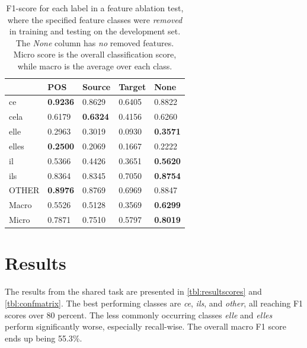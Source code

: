 \documentclass[11pt]{article}
\begin{document}
\begin{table}[t]
\centering
    \begin{tabular}{lllll}
         & POS & Source & Target & None \\ \midrule
   ce    & \textbf{0.9236}   & 0.8629         & 0.6405         &  0.8822 \\
   cela  & 0.6179   & \textbf{0.6324}         & 0.4156         &  0.6260 \\
   elle  & 0.2963   & 0.3019         & 0.0930          &  \textbf{0.3571} \\
   elles & \textbf{0.2500}   & 0.2069         & 0.1667         &  0.2222 \\
   il    & 0.5366   & 0.4426         & 0.3651         &  \textbf{0.5620} \\
   ils   & 0.8364   & 0.8345         & 0.7050         &  \textbf{0.8754} \\
   OTHER & \textbf{0.8976}   & 0.8769         & 0.6969         &  0.8847 \\
   \midrule
   Macro & 0.5526   & 0.5128          & 0.3569          &  \textbf{0.6299} \\
   Micro & 0.7871   & 0.7510          & 0.5797          &  \textbf{0.8019} \\
   \hline
    \end{tabular}
    \caption{F1-score for each label in a feature ablation test, where the specified feature classes were \emph{removed} in training and testing on the development set. The \emph{None} column has \emph{no} removed features. Micro score is the overall classification score, while macro is the average over each class.}
    \label{tbl:ablationscores}
\end{table}



\section{Results}

The results from the shared task are presented in \cref{tbl:resultscores} and \cref{tbl:confmatrix}.
The best performing classes are \emph{ce}, \emph{ils}, and \emph{other}, all reaching F1 scores over 80 percent. The less commonly occurring classes \emph{elle} and \emph{elles} perform significantly worse, especially recall-wise.
The overall macro F1 score ends up being 55.3\%.
\end{document}
